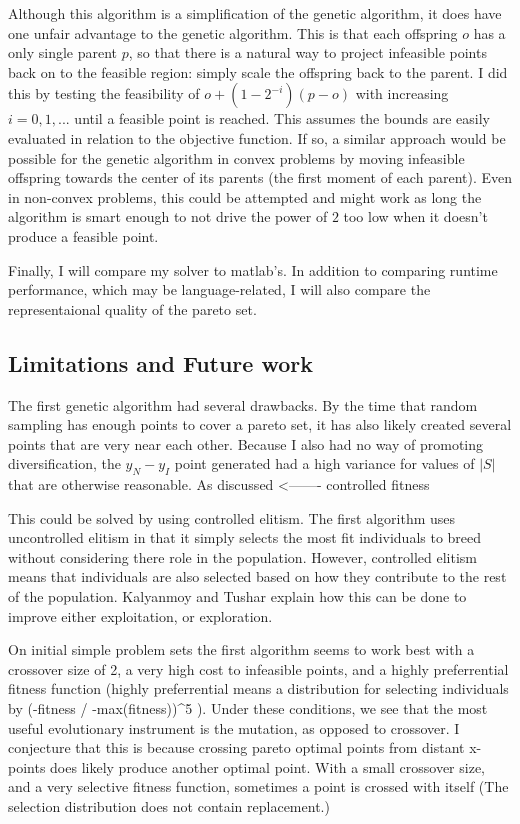 \documentclass{article}
\begin{document}
{{Although this algorithm is a simplification of the genetic algorithm, it does have one unfair advantage to the genetic algorithm.
This is that each offspring $o$ has a only single parent $p$, so that there is a natural way to project infeasible points back on to the feasible region: simply scale the offspring back to the parent.
I did this by testing the feasibility of $o + (1 - 2^{-i})(p - o)$ with increasing $i=0,1,...$ until a feasible point is reached.
This assumes the bounds are easily evaluated in relation to the objective function.
If so, a similar approach would be possible for the genetic algorithm in convex problems by moving infeasible offspring towards
the center of its parents (the first moment of each parent).
Even in non-convex problems, this could be attempted and might work as long the algorithm is smart enough to not drive the power of $2$ too low when it doesn't produce a feasible point.

Finally, I will compare my solver to matlab's.
In addition to comparing runtime performance, which may be language-related, I will also compare the representaional quality of the pareto set.


\subsection{Limitations and Future work}
The first genetic algorithm had several drawbacks.
By the time that random sampling has enough points to cover a pareto set, it has also likely created several points that are very near each other.
Because I also had no way of promoting diversification, the $y_N - y_I$ point generated had a high variance for values of $|S|$ that are otherwise reasonable.
As discussed <-------
controlled fitness 

This could be solved by using controlled elitism.
The first algorithm uses uncontrolled elitism in that it simply selects the most fit individuals to breed without considering there role in the population.
However, controlled elitism means that individuals are also selected based on how they contribute to the rest of the population.
Kalyanmoy and Tushar explain how this can be done to improve either exploitation, or exploration.

On initial simple problem sets the first algorithm seems to work best with a crossover size of 2, a very high cost to infeasible points, and a highly preferrential fitness function
(highly preferrential means a distribution for selecting individuals by (-fitness / -max(fitness))^5  ).
Under these conditions, we see that the most useful evolutionary instrument is the mutation, as opposed to crossover.
I conjecture that this is because crossing pareto optimal points from distant x-points does likely produce another optimal point.
With a small crossover size, and a very selective fitness function, sometimes a point is crossed with itself (The selection distribution does not contain replacement.)

}}
\end{document}
